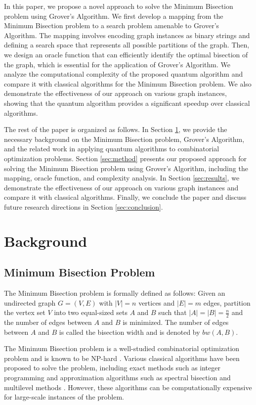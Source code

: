 In this paper, we propose a novel approach to solve the Minimum Bisection problem using Grover's Algorithm. We first develop a mapping from the Minimum Bisection problem to a search problem amenable to Grover's Algorithm. The mapping involves encoding graph instances as binary strings and defining a search space that represents all possible partitions of the graph. Then, we design an oracle function that can efficiently identify the optimal bisection of the graph, which is essential for the application of Grover's Algorithm. We analyze the computational complexity of the proposed quantum algorithm and compare it with classical algorithms for the Minimum Bisection problem. We also demonstrate the effectiveness of our approach on various graph instances, showing that the quantum algorithm provides a significant speedup over classical algorithms.

The rest of the paper is organized as follows. In Section \ref{sec:background}, we provide the necessary background on the Minimum Bisection problem, Grover's Algorithm, and the related work in applying quantum algorithms to combinatorial optimization problems. Section \ref{sec:method} presents our proposed approach for solving the Minimum Bisection problem using Grover's Algorithm, including the mapping, oracle function, and complexity analysis. In Section \ref{sec:results}, we demonstrate the effectiveness of our approach on various graph instances and compare it with classical algorithms. Finally, we conclude the paper and discuss future research directions in Section \ref{sec:conclusion}.

\section{Background}
\label{sec:background}

\subsection{Minimum Bisection Problem}
The Minimum Bisection problem is formally defined as follows: Given an undirected graph $G = (V, E)$ with $|V| = n$ vertices and $|E| = m$ edges, partition the vertex set $V$ into two equal-sized sets $A$ and $B$ such that $|A| = |B| = \frac{n}{2}$ and the number of edges between $A$ and $B$ is minimized. The number of edges between $A$ and $B$ is called the bisection width and is denoted by $bw(A, B)$.

The Minimum Bisection problem is a well-studied combinatorial optimization problem and is known to be NP-hard \cite{garey1976some}. Various classical algorithms have been proposed to solve the problem, including exact methods such as integer programming \cite{festa2009exact} and approximation algorithms such as spectral bisection \cite{pothen1990partitioning} and multilevel methods \cite{karypis1998multilevel}. However, these algorithms can be computationally expensive for large-scale instances of the problem.

